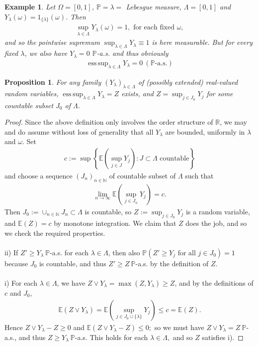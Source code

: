 \documentclass[12pt,a4paper, twoside]{article}
\newtheorem{prop}{Proposition}[section]
\newtheorem{exmp}{Example}[section]
\theoremstyle{definition}
\newcommand{\EE}{\mathbb{E}} %
\newcommand{\PP}{\mathbb{P}} %
\DeclareMathOperator*{\esssup}{ess\,sup}
\begin{document}
\begin{exmp} Let $\Omega = [0,1]$, $\PP= \lambda=$ Lebesgue measure, $\Lambda = [0,1]$ and $Y_\lambda( \omega)= 1_{\{ \lambda\}} ( \omega)$. Then 
\begin{align*}
\sup_{ \lambda \in \Lambda} Y_\lambda( \omega)=1, \text{ for each fixed } \omega,
\end{align*}
and so the pointwise supremum $\sup_{ \lambda \in \Lambda} Y_\lambda \equiv 1$ is here measurable. But for every fixed $\lambda$, we also have $Y_\lambda =0$ $\PP$-a.s. and thus obviously 
\begin{align*}
\esssup_{ \lambda \in \Lambda} Y_\lambda =0 \ (\PP\text{-a.s.})
\end{align*}
\end{exmp}
\newpage
\begin{prop} For any family $(Y_\lambda)_{\lambda \in \Lambda}$ of (possibly extended) real-valued random variables, $\esssup_{\lambda \in \Lambda} Y_\lambda = Z$ exists, and $Z= \sup_{j \in J_0} Y_j$ for some countable subset $J_0$ of $\Lambda$.
\end{prop}
\begin{proof}
Since the above definition only involves the order structure of $\mathbb{R}$,  we may and do assume without loss of generality that all $Y_\lambda$ are bounded, uniformly in $\lambda$ and $\omega$. Set 
\begin{align*}
c:= \sup \left\{ \EE \left( \sup_{j \in J} Y_j \right) : J \subset \Lambda \text{ countable} \right\}
\end{align*}
and choose a sequence $(J_n)_{n \in \mathbb{N}}$ of countable subset of $\Lambda$ such that 
\begin{align*}
\lim_{n \to \infty} \EE \left( \sup_{j \in J_n} Y_j \right) =c.
\end{align*}
Then $J_0:= \cup_{n \in \mathbb{N}} J_n \subset \Lambda$ is countable, so $Z:= \sup_{j \in J_0} Y_j$ is a random variable, and $\EE(Z)=c$ by monotone integration. We claim that $Z$ does the job, and so we check the required properties. \\
\\
ii) If $Z' \geq Y_\lambda \ \PP$-a.s. for each $\lambda \in \Lambda$,  then also $\PP(Z' \geq Y_j \text{ for all } j \in J_0)=1$ because $J_0$ is countable, and thus $Z' \geq Z \ \PP$-a.s. by the definition of $Z$. \\
\\
i) For each $\lambda \in \Lambda$, we have $Z \vee Y_\lambda = \max(Z, Y_\lambda) \geq Z$, and by the definitions of $c$ and $J_0$, 
\begin{align*}
\EE(Z \vee Y_\lambda ) = \EE \left( \sup_{j \in J_0 \cup \{ \lambda\}} Y_j \right) \leq c = \EE(Z).
\end{align*}
Hence $Z \vee Y_\lambda -Z \geq 0$ and $\EE(Z \vee Y_\lambda -Z) \leq 0;$ so we must have $Z \vee Y_\lambda = Z \ \PP$-a.s., and thus $Z \geq Y_\lambda \ \PP$-a.s. This holds for each $\lambda \in \Lambda,$ and so $Z$ satisfies i).
\end{proof}
\end{document}

